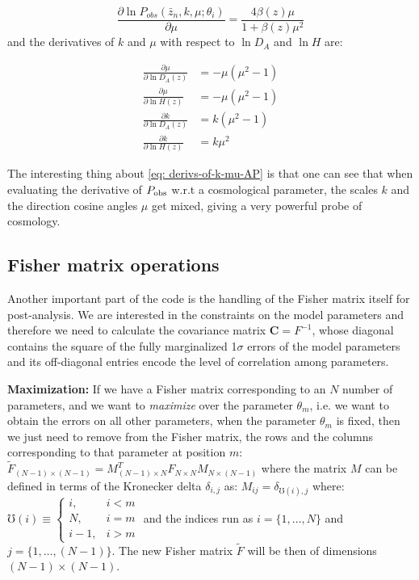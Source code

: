 \begin{equation}
\frac{\partial\ln P_{obs}\left(\bar{z}_n,k,\mu;\theta_{i}\right)}{\partial\mu}=\frac{4\beta(z)\mu}{1+\beta(z)\mu^{2}}
\end{equation}
and the derivatives of $k$ and $\mu$ with respect to $\ln D_{A}$
and $\ln H$ are:

\begin{subequations}
	
	\begin{align}
	\frac{\partial\mu}{\partial\ln D_{A}(z)} & =-\mu(\mu^{2}-1)\\
	\frac{\partial\mu}{\partial\ln H(z)} & =-\mu(\mu^{2}-1)\\
	\frac{\partial k}{\partial\ln D_{A}(z)} & =k(\mu^{2}-1)\\
	\frac{\partial k}{\partial\ln H(z)} & =k\mu^{2}
	\end{align}
	
	
	\label{eq: derivs-of-k-mu-AP}\end{subequations}

The interesting thing about \cref{eq: derivs-of-k-mu-AP} is that
one can see that when evaluating the derivative of $P_{\rm obs}$ w.r.t
a cosmological parameter, the scales $k$ and the direction cosine
angles $\mu$ get mixed, giving a very powerful probe of cosmology.


\subsection{Fisher matrix operations}

Another important part of the code is the handling of the Fisher matrix itself for post-analysis.
We are interested in the constraints on the model parameters and therefore we need to calculate
the covariance matrix $\mathbf{C} = F^{-1}$, whose diagonal contains the square of the fully marginalized 1$\sigma$
errors of the model parameters and its off-diagonal entries encode the level of correlation among parameters.

\textbf{Maximization: }
If we have a Fisher matrix corresponding to an $N$ number of parameters, and we want to \textit{maximize} over the parameter $\theta_m$, i.e. we want to obtain the errors on all other parameters,
when the parameter $\theta_m$ is fixed, then we just need to remove from the Fisher matrix, the rows and the columns
corresponding to that parameter at position $m$:
\beeq$
\tilde F_{(N-1) \times (N-1)} = M_{(N-1) \times N}^{T} F_{N \times N}^{\,} M_{N \times (N-1)}^{\,} 
$
where the matrix $M$ can be defined in terms of the Kronecker delta $\delta_{i,j}$ as:
\beeqc$ \label{eq:fix-matrix}
M_{i j} = \delta_{\mho(i) , j}
$
where:
\beeqc$ \label{eq:mho-piecewise}
\mho(i) \equiv
\begin{cases} 
i ,& i < m \\
N ,& i = m \\
i-1 ,& i > m 
\end{cases}
$
and the indices run as $i=\{1,\ldots,N\}$ and $j=\{1,\ldots,(N-1)\}$.
The new Fisher matrix $\tilde F$ will be then 
of dimensions $(N-1) \times (N-1)$.

